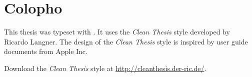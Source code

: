 %
\pagestyle{empty}
\hfill
\vfill
{}
\section*{Colopho}

This thesis was typeset with \LaTeXe.
It uses the \textit{Clean Thesis} style developed by Ricardo Langner.
The design of the \textit{Clean Thesis} style is inspired by user guide documents from Apple Inc.

Download the \textit{Clean Thesis} style at \url{http://cleanthesis.der-ric.de/}.
